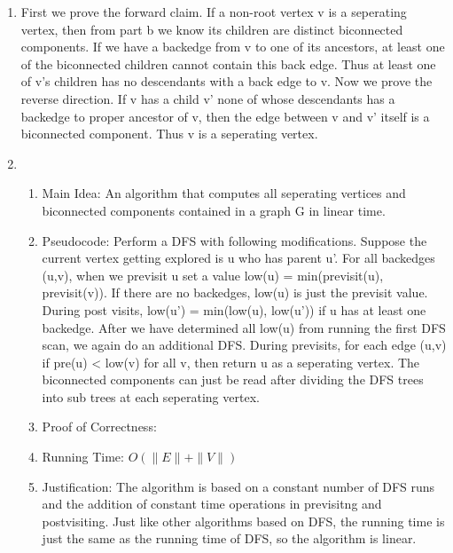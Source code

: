 \documentclass[11pt]{article}
\newenvironment{qparts}{\begin{enumerate}[{(}a{)}]}{\end{enumerate}}
\begin{document}
\begin{qparts}
Next we show the reverse direction: if the DFS root has more than 1 child, it seperates biconnected components. The properties of DFS guarantee that there are not any cross edges between the childrens' subtrees since DFS finds all nodes reachable from the children (thus any node has to be in either one child's sub tree or the other's). Since there are no cross edges, each sub tree is a distinct biconnected component, hence proving that the root is a seperating vertex.
\item First we prove the forward claim. If a non-root vertex v is a seperating vertex, then from part b we know its children are distinct biconnected components. If we have a backedge from v to one of its ancestors, at least one of the biconnected children cannot contain this back edge. Thus at least one of v's children has no descendants with a back edge to v. Now we prove the reverse direction. If v has a child v' none of whose descendants has a backedge to proper ancestor of v, then the edge between v and v' itself is a biconnected component. Thus v is a seperating vertex.
\item
\begin{enumerate}
\item Main Idea: An algorithm that computes all seperating vertices and biconnected components contained in a graph G in linear time.
\item Pseudocode: Perform a DFS with following modifications. Suppose the current vertex getting explored is u who has parent u'. For all backedges (u,v), when we previsit u set a value low(u) = min(previsit(u), previsit(v)). If there are no backedges, low(u) is just the previsit value. During post visits, low(u') = min(low(u), low(u')) if u has at least one backedge. After we have determined all low(u) from running the first DFS scan, we again do an additional DFS. During previsits, for each edge (u,v) if pre(u) < low(v) for all v, then return u as a seperating vertex. The biconnected components can just be read after dividing the DFS trees into sub trees at each seperating vertex.
\item Proof of Correctness: 
\item Running Time: $O(\|E\|+\|V\|)$
\item Justification: The algorithm is based on a constant number of DFS runs and the addition of constant time operations in previsitng and postvisiting. Just like other algorithms based on DFS, the running time is just the same as the running time of DFS, so the algorithm is linear.
\end{enumerate} 

\end{qparts}
\end{document}
